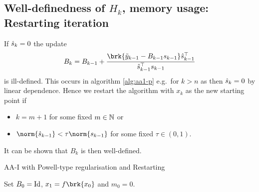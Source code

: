 %
%

\subsection{Well-definedness of $H_k$, memory usage: Restarting iteration}

	
If $\hat{s}_k=0$ the update
\begin{align*}
	B_{k} = B_{k-1}+\frac{\brk{\tiy_{k-1}-B_{k-1}s_{k-1}}\hs_{k-1}^\top}{\hs_{k-1}^\top s_{k-1}}
\end{align*}
is ill-defined. This occurs in algorithm \ref{alg:aa1-p} e.g.\ for $k>n$ as then $\hat{s}_k=0$ by linear dependence.
Hence we restart the algorithm with $x_k$ as the new starting point if
\begin{itemize}
	\item $k=m+1$ for some fixed $m\in\mathbb{N}$ or
	\item $\norm{\hs_{k-1}}<\tau\norm{s_{k-1}}$ for some fixed $\tau\in(0,1)$.
\end{itemize}
It can be shown that $B_k$ is then well-defined.



\begin{algorithm}[H]
\caption{AA-I with Powell-type regularisation and Restarting}\label{alg:aa1-pr}

\BlankLine
Set $B_0=\operatorname{Id}$, $x_1=f\brk{x_0}$ and {\black $m_0 = 0$}.

\end{algorithm}


